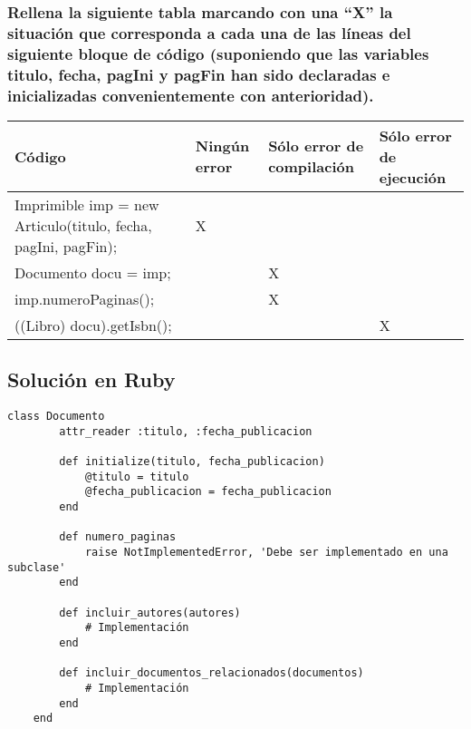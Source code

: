 \documentclass[a4paper,12pt]{article}
\begin{document}
\subsubsection*{Rellena la siguiente tabla marcando con una “X” la situación que corresponda a cada una de las líneas del siguiente bloque de código (suponiendo que las variables titulo, fecha, pagIni y pagFin han sido declaradas e inicializadas convenientemente con anterioridad).}

\begin{table}[H]
    \centering
    \begin{tabular}{|p{4cm}|p{4cm}|p{4cm}|p{4cm}|}
        \hline
        \textbf{Código} & \textbf{Ningún error} & \textbf{Sólo error de compilación} & \textbf{Sólo error de ejecución} \\ \hline
        Imprimible imp = new Articulo(titulo, fecha, pagIni, pagFin); & X &  &  \\ \hline
        Documento docu = imp; &  & X &  \\ \hline
        imp.numeroPaginas(); &  & X &  \\ \hline
        ((Libro) docu).getIsbn(); &  &  & X \\ \hline
    \end{tabular}
\end{table}

\subsection{Solución en Ruby}

\begin{lstlisting}[style=customrb, caption={Clase Documento (cabecera, atributos y cabeceras de los métodos)}]
    class Documento
        attr_reader :titulo, :fecha_publicacion

        def initialize(titulo, fecha_publicacion)
            @titulo = titulo
            @fecha_publicacion = fecha_publicacion
        end

        def numero_paginas
            raise NotImplementedError, 'Debe ser implementado en una subclase'
        end

        def incluir_autores(autores)
            # Implementación
        end

        def incluir_documentos_relacionados(documentos)
            # Implementación
        end
    end
\end{lstlisting}
\end{document}
